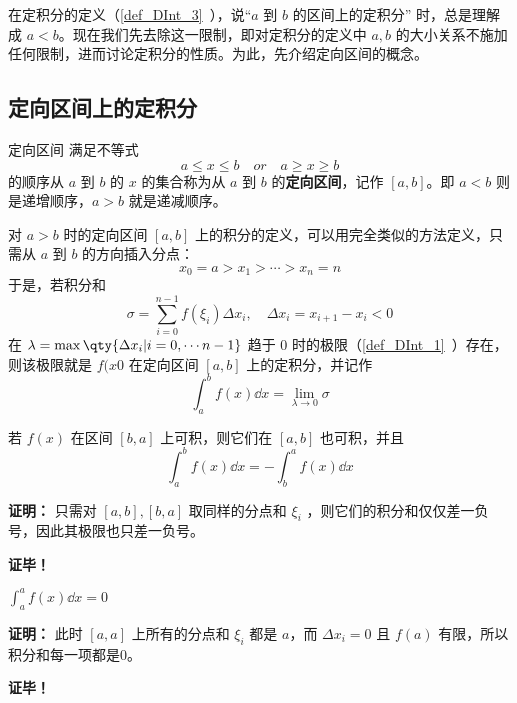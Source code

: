 
在定积分的定义（\autoref{def_DInt_3}~），说“$a$ 到 $b$ 的区间上的定积分” 时，总是理解成 $a<b$。现在我们先去除这一限制，即对定积分的定义中 $a,b$ 的大小关系不施加任何限制，进而讨论定积分的性质。为此，先介绍定向区间的概念。
\subsection{定向区间上的定积分}
\begin{definition}{定向区间}
满足不等式
\begin{equation}
a\leq x\leq b\quad or\quad a\geq x\geq b
\end{equation}
的顺序从 $a$ 到 $b$ 的 $x$ 的集合称为从 $a$ 到 $b$ 的\textbf{定向区间}，记作 $[a,b]$。即 $a<b$ 则是递增顺序，$a>b$ 就是递减顺序。
\end{definition}
对 $a>b$ 时的定向区间 $[a,b]$ 上的积分的定义，可以用完全类似的方法定义，只需从 $a$ 到 $b$ 的方向插入分点：
\begin{equation}
x_0=a>x_1>\cdots>x_n=n
\end{equation}
于是，若积分和
\begin{equation}
\sigma=\sum_{i=0}^{n-1}f(\xi_i)\Delta x_i,\quad\Delta x_i=x_{i+1}-x_i<0
\end{equation}
在 $\lambda=\max\qty{\Delta x_i|i=0,\cdots n-1}$ 趋于 0 时的极限（\autoref{def_DInt_1}~）存在，则该极限就是 $f(x0$ 在定向区间 $[a,b]$ 上的定积分，并记作
\begin{equation}
\int_a^b f(x)\dd x=\lim_{\lambda\rightarrow0}\sigma
\end{equation}

\begin{theorem}{}
若 $f(x)$ 在区间 $[b,a]$ 上可积，则它们在 $[a,b]$ 也可积，并且
\begin{equation}
\int_a^b f(x)\dd x=-\int_b^a f(x)\dd x
\end{equation}
\end{theorem} 

\textbf{证明：}
只需对 $[a,b],[b,a]$ 取同样的分点和 $\xi_i$ ，则它们的积分和仅仅差一负号，因此其极限也只差一负号。

\textbf{证毕！}
\begin{theorem}{}
$\int_a^a f(x)\dd x=0$
\end{theorem}
\textbf{证明：}
此时 $[a,a]$ 上所有的分点和 $\xi_i$ 都是 $a$，而 $\Delta x_i=0$ 且 $f(a)$ 有限，所以积分和每一项都是0。

\textbf{证毕！} 
